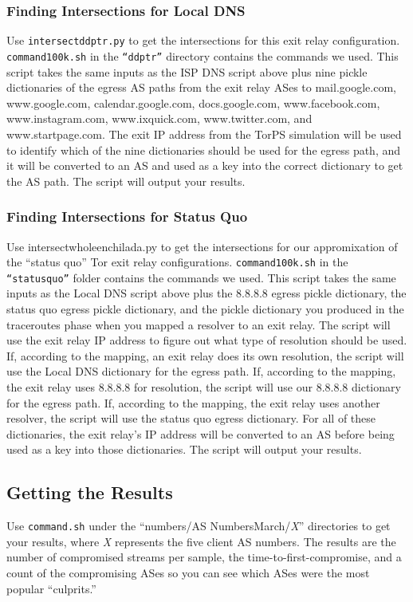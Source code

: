 \documentclass{article}
\begin{document}
\subsubsection{Finding Intersections for Local DNS}
Use {\tt intersect\textunderscore ddptr.py} to get the intersections for this 
exit relay configuration. {\tt command\textunderscore 100k.sh} in the {\tt ``ddptr''} 
directory contains the commands we used. This script takes the same inputs as the ISP 
DNS script above plus nine pickle dictionaries of the egress AS paths from the 
exit relay ASes to mail.google.com, www.google.com, calendar.google.com, 
docs.google.com, www.facebook.com, www.instagram.com, www.ixquick.com, www.twitter.com, 
and www.startpage.com. The exit IP address from the TorPS simulation will be used 
to identify which of the nine dictionaries should be used for the egress path, and 
it will be converted to an AS and used as a key into the correct dictionary to get 
the AS path. The script will output your results.

\subsubsection{Finding Intersections for Status Quo}
Use intersect\textunderscore whole\textunderscore enchilada.py to get the 
intersections for our appromixation of the ``status quo'' Tor exit relay 
configurations. {\tt command\textunderscore 100k.sh} in the 
{\tt ``status\textunderscore quo''} folder contains the commands we used. This script 
takes the same inputs as the Local DNS script above plus the 8.8.8.8 egress 
pickle dictionary, the status quo egress pickle dictionary, and the pickle 
dictionary you produced in the traceroutes phase when you mapped a resolver to an 
exit relay. The script will use the exit relay IP address to figure out what type of 
resolution should be used. If, according to the mapping, an exit relay does its own 
resolution, the script will use the Local DNS dictionary for the egress path. If, 
according to the mapping, the exit relay uses 8.8.8.8 for resolution, the script will 
use our 8.8.8.8 dictionary for the egress path. If, according to the mapping, the exit 
relay uses another resolver, the script will use the status quo egress dictionary. For 
all of these dictionaries, the exit relay's IP address will be converted to an AS before 
being used as a key into those dictionaries. The script will output your results.

\subsection{Getting the Results}
Use {\tt command.sh} under the ``numbers/AS\textunderscore 
Numbers\textunderscore March/\emph{X}'' directories 
to get your results, where \emph{X} represents the five client AS numbers. The results are 
the number of compromised streams per sample, the time-to-first-compromise, and a count 
of the compromising ASes so you can see which ASes were the most popular ``culprits.'' 
\end{document}
